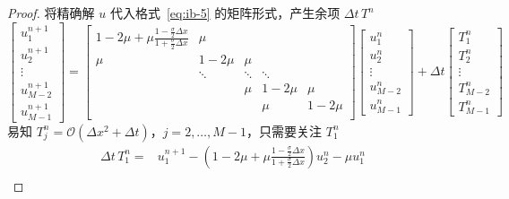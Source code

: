 \begin{proof}
    将精确解 $u$ 代入格式~\eqref{eq:ib-5} 的矩阵形式，产生余项 $\Delta t \,T^n$
    \[
        \begin{bmatrix}
            u_1^{n+1} \\ u_2^{n+1} \\ \vdots \\ u_{M-2}^{n+1} \\ u_{M-1}^{n+1}
        \end{bmatrix}
        =
        \begin{bmatrix}
            1-2\mu + \mu\frac{1-\frac{\sigma}2 \Delta x}{1 + \frac{\sigma}2 \Delta x} & \mu    &        &        &        \\
            \mu                                                                       & 1-2\mu & \mu    &        &        \\
                                                                                      & \ddots & \ddots & \ddots &        \\
                                                                                      &        & \mu    & 1-2\mu & \mu    \\
                                                                                      &        &        & \mu    & 1-2\mu \\
        \end{bmatrix}
        \begin{bmatrix}
            u_1^{n} \\ u_2^{n} \\ \vdots \\ u_{M-2}^{n} \\ u_{M-1}^{n}
        \end{bmatrix}
        +
        \Delta t
        \begin{bmatrix}
            T_1^{n} \\ T_2^{n} \\ \vdots \\ T_{M-2}^{n} \\ T_{M-1}^{n}
        \end{bmatrix}
    \]
    易知 $T_j^{n} = \mathcal{O}(\Delta x^2 + \Delta t)$，$j=2,\dots,M-1$，只需要关注 $T_1^{n}$
    \begin{align*}
        \Delta t\, T_1^{n} ={} & u_1^{n+1} - \left(1-2\mu + \mu \frac{1-\frac{\sigma}2 \Delta x}{1 + \frac{\sigma}2 \Delta x}\right) u_2^n
        - \mu u_1^n                                                                                                                        \\

\end{align*}
\end{proof}
